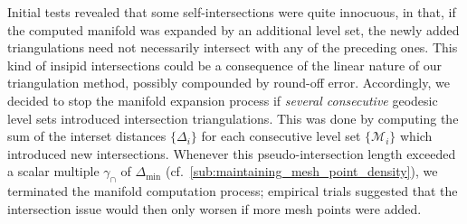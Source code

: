 

Initial tests revealed that some self-intersections were quite innocuous, in
that, if the computed manifold was expanded by an additional level set,
the newly added triangulations need not necessarily intersect with any of the
preceding ones. This kind of insipid intersections could be a consequence of
the linear nature of our triangulation method, possibly compounded by round-off
error. Accordingly, we decided to stop the manifold expansion process
if \emph{several consecutive} geodesic level sets introduced intersection
triangulations. This was done by computing the sum of the interset distances
$\{\Delta_{i}\}$ for each consecutive level set $\{\mathcal{M}_{i}\}$ which
introduced new intersections. Whenever this pseudo-intersection length
exceeded a scalar multiple $\gamma_{\cap}$ of $\Delta_{\min}$ (cf.\
\cref{sub:maintaining_mesh_point_density}),
we terminated the manifold computation process; empirical trials suggested
that the intersection issue would then only worsen if more mesh points were
added.

